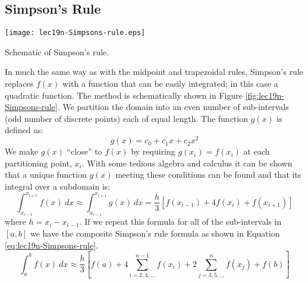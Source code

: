 \subsection{Simpson's Rule}
\begin{marginfigure}
\texttt{[image: lec19n-Simpsons-rule.eps]}
\caption{Schematic of Simpson's rule.}
\label{fig:lec19n-Simpsons-rule}
\end{marginfigure}
In much the same way as with the midpoint and trapezoidal rules, Simpson's rule replaces $f(x)$ with a function that can be easily integrated; in this case a quadratic function.  The method is schematically shown in Figure \ref{fig:lec19n-Simpsons-rule}.  We partition the domain into an even number of sub-intervals (odd number of discrete points) each of equal length.  The function $g(x)$ is defined as:
\begin{equation*}
g(x) = c_0 + c_1x + c_2 x^2
\end{equation*}
We make $g(x)$ ``close'' to $f(x)$ by requiring $g(x_i) = f(x_i)$ at each partitioning point, $x_i$.  With some tedious algebra and calculus it can be shown that a unique function $g(x)$ meeting these conditions can be found and that its integral over a subdomain is:
\begin{equation*}
\int_{x_{i-1}}^{x_{i+1}} f(x) \ dx \approx \int_{x_{i-1}}^{x_{i+1}} g(x) \ dx = \frac{h}{3}\left[f(x_{i-1})+4f(x_i)+f(x_{i+1})\right] 
\end{equation*}
where $h = x_i - x_{i-1}$.
If we repeat this formula for all of the sub-intervals in $[a,b]$ we have the composite Simpson's rule formula as shown in Equation \ref{eq:lec19n-Simpsons-rule}.
\begin{equation}
\int_{a}^{b}f(x) \ dx \approx \frac{h}{3} \left[f(a) + 4 \sum\limits_{i=2,4,\dots}^{n-1} f(x_i) + 2 \sum\limits_{j=3,5,\dots}^{n} f(x_j) + f(b) \right]
\label{eq:lec19n-Simpsons-rule}
\end{equation}

